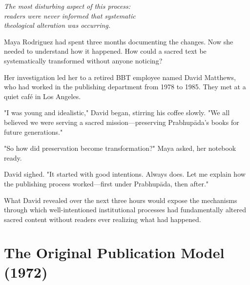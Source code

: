 \documentclass[11pt,twoside]{book}
\begin{document}
{\centering\itshape The most disturbing aspect of this process:\\readers were never informed that systematic\\theological alteration was occurring.\par}
\vspace{0.3cm}

\normalfont\justifying
Maya Rodriguez had spent three months documenting the changes. Now she needed to understand how it happened. How could a sacred text be systematically transformed without anyone noticing? 

Her investigation led her to a retired BBT employee named David Matthews, who had worked in the publishing department from 1978 to 1985. They met at a quiet café in Los Angeles.

"I was young and idealistic," David began, stirring his coffee slowly. "We all believed we were serving a sacred mission—preserving Prabhupāda's books for future generations."

"So how did preservation become transformation?" Maya asked, her notebook ready.

David sighed. "It started with good intentions. Always does. Let me explain how the publishing process worked—first under Prabhupāda, then after."

What David revealed over the next three hours would expose the mechanisms through which well-intentioned institutional processes had fundamentally altered sacred content without readers ever realizing what had happened.
\section*{The Original Publication Model (1972)}
\label{sec:org241b8e1}
\end{document}
